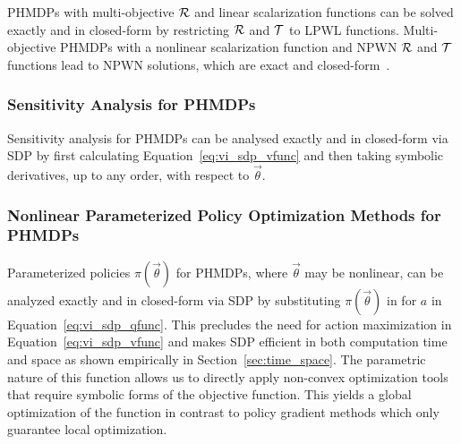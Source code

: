 PHMDPs with multi-objective {\footnotesize $\mathcal{R}$} and linear scalarization functions can be solved exactly and in closed-form by restricting {\footnotesize $\mathcal{R}$} and {\footnotesize $\mathcal{T}$} to LPWL functions. Multi-objective PHMDPs with a nonlinear scalarization function and NPWN {\footnotesize $\mathcal{R}$} and {\footnotesize $\mathcal{T}$} functions lead to NPWN solutions, which are exact and closed-form~\cite{Sanner_UAI_2011}.

\subsubsection{Sensitivity Analysis for PHMDPs}

Sensitivity analysis for PHMDPs can be analysed exactly and in closed-form via SDP by first calculating Equation~\eqref{eq:vi_sdp_vfunc} and then taking symbolic derivatives, up to any order, with respect to %
{\footnotesize $\vec{\theta}$}.

\subsubsection{Nonlinear Parameterized Policy Optimization Methods for PHMDPs}

Parameterized policies {\footnotesize $ \pi(\vec{\theta}) $} for PHMDPs, where {\footnotesize $\vec{\theta}$} may be nonlinear, can be analyzed exactly and in closed-form via SDP by substituting {\footnotesize $ \pi(\vec{\theta}) $} in for {\footnotesize  $ a $} in Equation~\eqref{eq:vi_sdp_qfunc}. This precludes the need for action maximization in Equation~\eqref{eq:vi_sdp_vfunc} and makes SDP efficient in both computation time and space as shown empirically in Section~\ref{sec:time_space}. The parametric nature of this function allows us to directly apply non-convex optimization tools that require symbolic forms of the objective function. 
This yields a global optimization of the function in contrast to policy gradient methods which only guarantee local optimization.